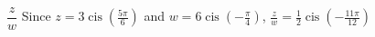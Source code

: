 { $\dfrac{z}{w}$}
{ Since $z = 3\operatorname{cis}\left(\frac{5\pi}{6}\right)$ and $w = 6\operatorname{cis}\left(-\frac{\pi}{4}\right)$,  $\frac{z}{w} = \frac{1}{2}\operatorname{cis}\left(-\frac{11\pi}{12}\right)$}
